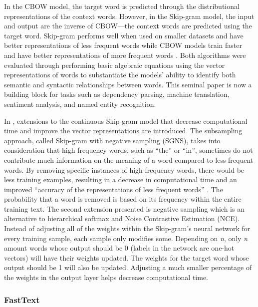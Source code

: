 In the CBOW model, the target word is predicted through the distributional representations of the context words. However, in the Skip-gram model, the input and output are the inverse of CBOW—the context words are predicted using the target word.  Skip-gram performs well when used on smaller datasets and have better representations of less frequent words while CBOW models train faster and have better representations of more frequent words \citep{mikolov2013efficient}. Both algorithms were evaluated through performing basic algebraic equations using the vector representations of words to substantiate the models’ ability to identify both semantic and syntactic relationships between words. This seminal paper is now a building block for tasks such as dependency parsing, machine translation, sentiment analysis, and named entity recognition.


In \citet{mikolov2013distributed}, extensions to the continuous Skip-gram model that decrease computational time and improve the vector representations are introduced. The subsampling approach, called Skip-gram with negative sampling (SGNS), takes into consideration that high frequency words, such as “the” or “in”, sometimes do not contribute much information on the meaning of a word compared to less frequent words. By removing specific instances of high-frequency words, there would be less training examples, resulting in a decrease in computational time and an improved “accuracy of the representations of less frequent words” \citep{mikolov2013distributed}. The probability that a word is removed is based on its frequency within the entire training text. The second extension presented is negative sampling which is an alternative to hierarchical softmax and Noise Contrastive Estimation (NCE). Instead of adjusting all of the weights within the Skip-gram’s neural network for every training sample, each sample only modifies some. Depending on \emph{n}, only \emph{n} amount words whose output should be 0 (labels in the network are one-hot vectors) will have their weights updated. The weights for the target word whose output should be 1 will also be updated. Adjusting a much smaller percentage of the weights in the output layer helps decrease computational time.


\subsubsection{FastText}


